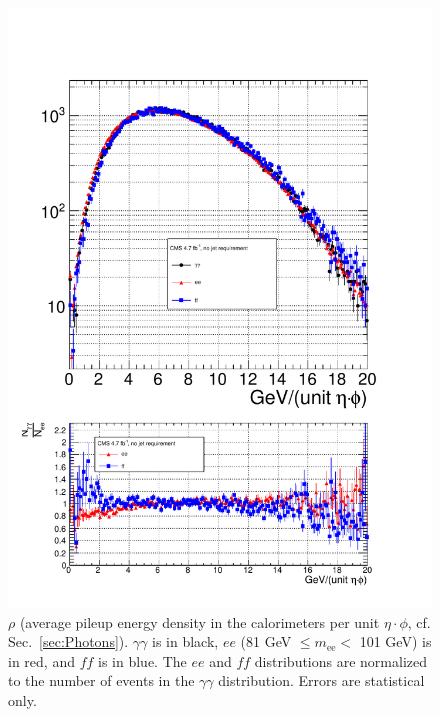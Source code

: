 \documentclass[dissertation.tex]{subfiles}
\begin{document}
\begin{figure}
	\centering
	\includegraphics[scale=0.5]{hadronic_activity_rho}
	\caption{$\rho$ (average pileup energy density in the calorimeters per unit $\eta\cdot\phi$, cf. Sec.~\ref{sec:Photons}).  $\gamma\gamma$ is in black, $ee$ (81 GeV $\leq m_{\mathrm{ee}} <$ 101 GeV) is in red, and $\mathit{ff}$ is in blue.  The $ee$ and $\mathit{ff}$ distributions are normalized to the number of events in the $\gamma\gamma$ distribution.  Errors are statistical only.}
	\label{fig:hadronic_activity_rho}
\end{figure}
\end{document}
